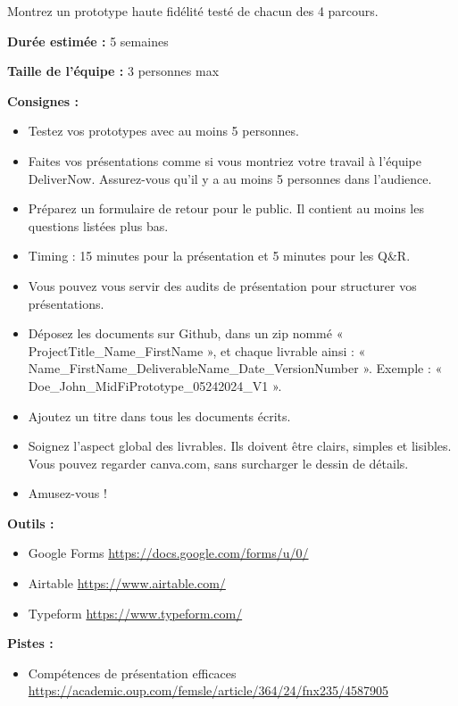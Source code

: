 \makeheaderfiles

Montrez un prototype haute fidélité testé de chacun des 4 parcours.

\textbf{Durée estimée :} 5 semaines

\textbf{Taille de l'équipe :} 3 personnes max

\textbf{Consignes :}

\begin{itemize}
\item Testez vos prototypes avec au moins 5 personnes.
\item Faites vos présentations comme si vous montriez votre travail à l'équipe DeliverNow. Assurez-vous qu'il y a au moins 5 personnes dans l'audience.
\item Préparez un formulaire de retour pour le public. Il contient au moins les questions listées plus bas.
\item Timing : 15 minutes pour la présentation et 5 minutes pour les Q\&R.
\item Vous pouvez vous servir des audits de présentation pour structurer vos présentations.
\item Déposez les documents sur Github, dans un zip nommé « ProjectTitle\_Name\_FirstName », et chaque livrable ainsi : « Name\_FirstName\_DeliverableName\_Date\_VersionNumber ». Exemple : « Doe\_John\_MidFiPrototype\_05242024\_V1 ».
\item Ajoutez un titre dans tous les documents écrits.
\item Soignez l'aspect global des livrables. Ils doivent être clairs, simples et lisibles. Vous pouvez regarder canva.com, sans surcharger le dessin de détails.
\item Amusez-vous !
\end{itemize}

\textbf{Outils :}

\begin{itemize}
\item Google Forms \url{https://docs.google.com/forms/u/0/}
\item Airtable \url{https://www.airtable.com/}
\item Typeform \url{https://www.typeform.com/}
\end{itemize}

\textbf{Pistes :}

\begin{itemize}
\item Compétences de présentation efficaces \url{https://academic.oup.com/femsle/article/364/24/fnx235/4587905}
\end{itemize}

